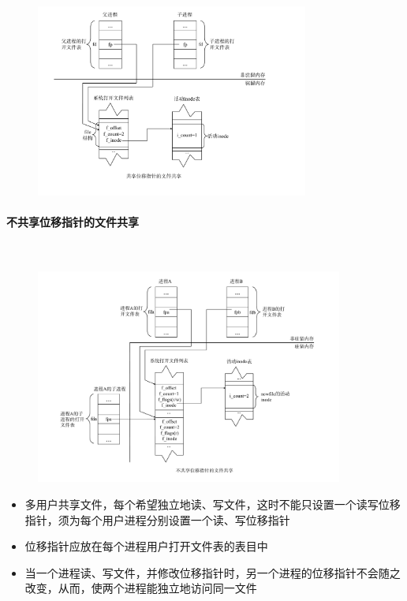\documentclass[cs4size,a4paper,10pt]{ctexart}
\begin{document}
	\begin{figure}[H]
		\centering
		\includegraphics[width=0.8\textwidth]{img/5.4.1.2.1}
	\end{figure}
	
	\paragraph{不共享位移指针的文件共享}~{}

	\begin{figure}[H]
		\centering
		\includegraphics[width=0.9\textwidth]{img/5.4.1.2.2}
	\end{figure}

	\begin{itemize}
		\item 多用户共享文件，每个希望独立地读、写文件，这时不能只设置一个读写位移指针，须为每个用户进程分别设置一个读、写位移指针
		\item 位移指针应放在每个进程用户打开文件表的表目中
		\item 当一个进程读、写文件，并修改位移指针时，另一个进程的位移指针不会随之改变，从而，使两个进程能独立地访问同一文件
	\end{itemize}
\end{document}
